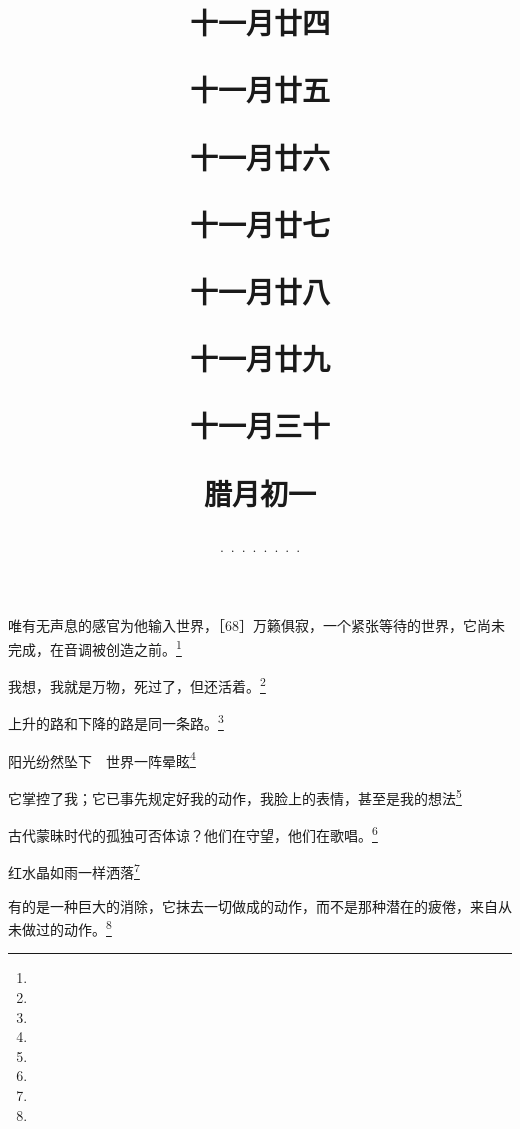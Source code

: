 \title{\date[d=24,m=12,y=2024][year:cn-y,年,month:cn,day:cn,日,·,weekday]·十一月廿四 }
唯有无声息的感官为他输入世界，［68］万籁俱寂，一个紧张等待的世界，它尚未完成，在音调被创造之前。\footnote{ }

\title{\date[d=25,m=12,y=2024][year:cn-y,年,month:cn,day:cn,日,·,weekday]·十一月廿五 }
我想，我就是万物，死过了，但还活着。\footnote{ }

\title{\date[d=26,m=12,y=2024][year:cn-y,年,month:cn,day:cn,日,·,weekday]·十一月廿六 }
上升的路和下降的路是同一条路。\footnote{ }

\title{\date[d=27,m=12,y=2024][year:cn-y,年,month:cn,day:cn,日,·,weekday]·十一月廿七 }
阳光纷然坠下　世界一阵晕眩\footnote{ }

\title{\date[d=28,m=12,y=2024][year:cn-y,年,month:cn,day:cn,日,·,weekday]·十一月廿八 }
它掌控了我；它已事先规定好我的动作，我脸上的表情，甚至是我的想法\footnote{ }

\title{\date[d=29,m=12,y=2024][year:cn-y,年,month:cn,day:cn,日,·,weekday]·十一月廿九 }
古代蒙昧时代的孤独可否体谅？他们在守望，他们在歌唱。\footnote{ }

\title{\date[d=30,m=12,y=2024][year:cn-y,年,month:cn,day:cn,日,·,weekday]·十一月三十 }
红水晶如雨一样洒落\footnote{ }

\title{\date[d=31,m=12,y=2024][year:cn-y,年,month:cn,day:cn,日,·,weekday]·腊月初一 }
有的是一种巨大的消除，它抹去一切做成的动作，而不是那种潜在的疲倦，来自从未做过的动作。\footnote{ }

